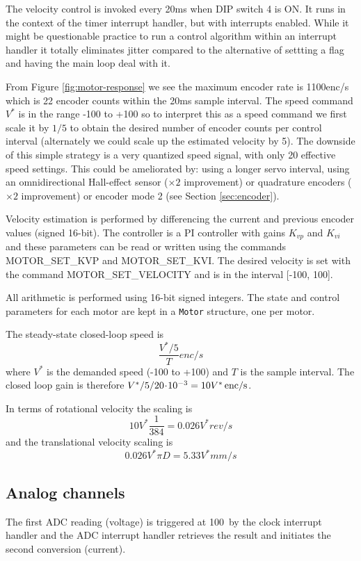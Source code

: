 \documentclass[11pt,fleqn]{article}
\begin{document}
The velocity control is invoked every 20\unit{ms} when DIP switch 4 is ON.
It runs in the context of the timer interrupt handler, but with interrupts enabled.
While it might be questionable practice to run a control algorithm within an interrupt handler it totally eliminates jitter compared to the 
alternative of settting a flag and having the main loop deal with it.

From Figure \ref{fig:motor-response} we see the maximum encoder rate is 1100\unit{enc/s} which is  22 encoder counts within the 20\unit{ms} sample interval.
The speed command $V^*$ is in the range -100 to +100 so to interpret this as a speed command we first scale it by $1/5$
 to obtain the desired number of encoder counts per control interval (alternately we could scale up the estimated velocity by 5).
The downside of this simple strategy is a very quantized speed signal, with only 20 effective speed settings.
This could be ameliorated by: using a longer servo interval, using an omnidirectional Hall-effect sensor ($\times 2$ improvement) or quadrature
encoders ($\times 2$ improvement) or encoder mode 2 (see Section \ref{sec:encoder}).

Velocity estimation is performed by differencing the current and previous encoder values (signed 16-bit).
The controller is a PI controller with gains $K_{vp}$ and $K_{vi}$ and these parameters
 can be read or written using the commands MOTOR\_SET\_KVP and MOTOR\_SET\_KVI.
The desired velocity is set with the command MOTOR\_SET\_VELOCITY and is in the interval [-100, 100].

All arithmetic is performed using 16-bit signed integers.
The state and control parameters for each motor are kept in a \texttt{Motor} structure, one per motor.

The steady-state closed-loop speed is
\[
\frac{V^*/5}{T}\unit{enc/s}
\]
where $V^*$ is the demanded speed (-100 to +100) and $T$ is the sample interval.
The closed loop gain is therefore $V^*/5/\mbox{$20\!\cdot\!10^{-3}$} =  10 V^*\mbox{$\mathrm{\,enc/s}$}$.

In terms of rotational velocity the scaling is 
\[
10 V^* \frac{1}{384} = 0.026V^* \unit{rev/s}
\]
and the translational velocity scaling is
\[
0.026 V^*  \pi D = 5.33V^* \unit{mm/s}
\]

\subsection{Analog channels}

The first ADC reading (voltage) is triggered at 100\Hz\ by the clock interrupt handler and the ADC interrupt handler retrieves the result and initiates the second conversion (current).
\end{document}
